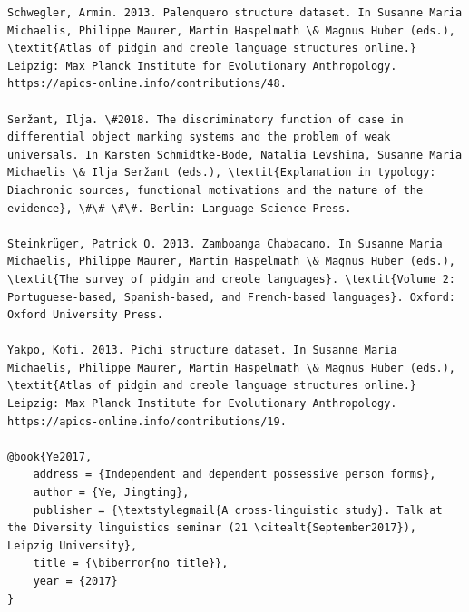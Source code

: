 \documentclass[output=paper]{langsci/langscibook}
\begin{document}
\begin{verbatim}
Schwegler, Armin. 2013. Palenquero structure dataset. In Susanne Maria Michaelis, Philippe Maurer, Martin Haspelmath \& Magnus Huber (eds.), \textit{Atlas of pidgin and creole language structures online.} Leipzig: Max Planck Institute for Evolutionary Anthropology. https://apics-online.info/contributions/48.

Seržant, Ilja. \#2018. The discriminatory function of case in differential object marking systems and the problem of weak universals. In Karsten Schmidtke-Bode, Natalia Levshina, Susanne Maria Michaelis \& Ilja Seržant (eds.), \textit{Explanation in typology: Diachronic sources, functional motivations and the nature of the evidence}, \#\#–\#\#. Berlin: Language Science Press.

Steinkrüger, Patrick O. 2013. Zamboanga Chabacano. In Susanne Maria Michaelis, Philippe Maurer, Martin Haspelmath \& Magnus Huber (eds.), \textit{The survey of pidgin and creole languages}. \textit{Volume 2: Portuguese-based, Spanish-based, and French-based languages}. Oxford: Oxford University Press.

Yakpo, Kofi. 2013. Pichi structure dataset. In Susanne Maria Michaelis, Philippe Maurer, Martin Haspelmath \& Magnus Huber (eds.), \textit{Atlas of pidgin and creole language structures online.} Leipzig: Max Planck Institute for Evolutionary Anthropology. https://apics-online.info/contributions/19.

@book{Ye2017,
	address = {Independent and dependent possessive person forms},
	author = {Ye, Jingting},
	publisher = {\textstylegmail{A cross-linguistic study}. Talk at the Diversity linguistics seminar (21 \citealt{September2017}), Leipzig University},
	title = {\biberror{no title}},
	year = {2017}
}


\end{verbatim}
\end{document}
